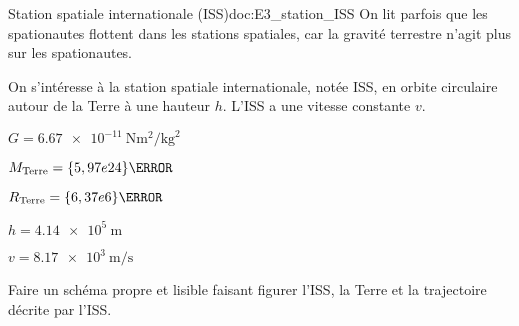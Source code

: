 
\begin{doc}{Station spatiale internationale (ISS)}{doc:E3_station_ISS}
  On lit parfois que les spationautes flottent dans les stations spatiales, car la gravité terrestre n'agit plus sur les spationautes.
  
  \begin{wrapfigure}{r}{0.4\linewidth}
    \vspace*{-30pt}
    \centering
  \end{wrapfigure}
  
  On s'intéresse à la station spatiale internationale, notée ISS, en orbite circulaire autour de la Terre à une hauteur $h$.
  L'ISS a une vitesse constante $v$.

  \begin{listePoints}
    \item $G = \qty{6,67e-11}{\newton\m\squared \per\kg\squared}$
    \item $\MTerre = \qty{5,97e24}{\kg}$
    \item $\RTerre = \qty{6,37e6}{\m}$
    \item $h = \qty{4,14e5}{\m}$
    \item $v = \qty{8,17e3}{\m\per\s}$
  \end{listePoints}
\end{doc}


\numeroQuestion
  \label{exo:schema_ISS}
  Faire un schéma propre et lisible faisant figurer l'ISS, la Terre et la trajectoire décrite par l'ISS.


